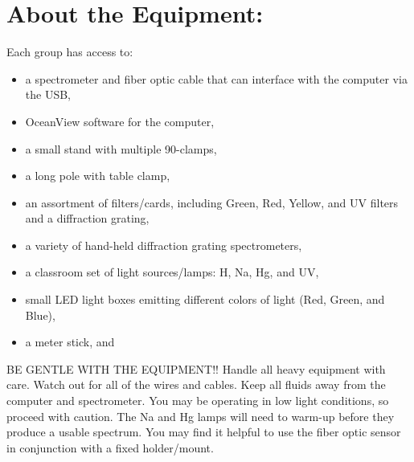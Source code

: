 \section*{About the Equipment:}
Each group has access to:
\begin{itemize}
\itemsep-0.3em
\item a spectrometer and fiber optic cable that can interface with the computer via the USB,
\item OceanView software for the computer,
\item a small stand with multiple 90-clamps,
\item a long pole with table clamp,
\item an assortment of filters/cards, including Green, Red, Yellow, and UV filters and a diffraction grating,
\item a variety of hand-held diffraction grating spectrometers,
\item a classroom set of light sources/lamps: H, Na, Hg, and UV,
\item small LED light boxes emitting different colors of light (Red, Green, and Blue),
\item a meter stick, and
\end{itemize}
BE GENTLE WITH THE EQUIPMENT!! 
Handle all heavy equipment with care. 
Watch out for all of the wires and cables. 
Keep all fluids away from the computer and spectrometer.
You may be operating in low light conditions, so proceed with caution. 
The Na and Hg lamps will need to warm-up before they produce a usable spectrum. 
You may find it helpful to use the fiber optic sensor in conjunction with a fixed holder/mount.

